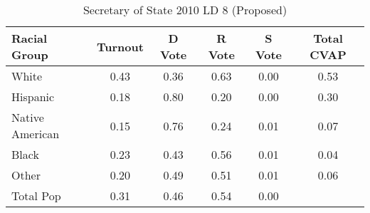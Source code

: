 \begin{table}[htb]
\begin{center}
\caption{Secretary of State 2010 LD 8 (Proposed)}
\label{sos10_cvap_ld_8}
\begin{tabular}{lccccc}
  \hline
Racial Group & Turnout & D Vote & R Vote & S Vote & Total CVAP \\ 
  \hline
White & 0.43 & 0.36 & 0.63 & 0.00 & 0.53 \\ 
  Hispanic & 0.18 & 0.80 & 0.20 & 0.00 & 0.30 \\ 
  Native American & 0.15 & 0.76 & 0.24 & 0.01 & 0.07 \\ 
  Black & 0.23 & 0.43 & 0.56 & 0.01 & 0.04 \\ 
  Other & 0.20 & 0.49 & 0.51 & 0.01 & 0.06 \\ 
  Total Pop & 0.31 & 0.46 & 0.54 & 0.00 &  \\ 
   \hline
\end{tabular}
\end{center}
\end{table}
